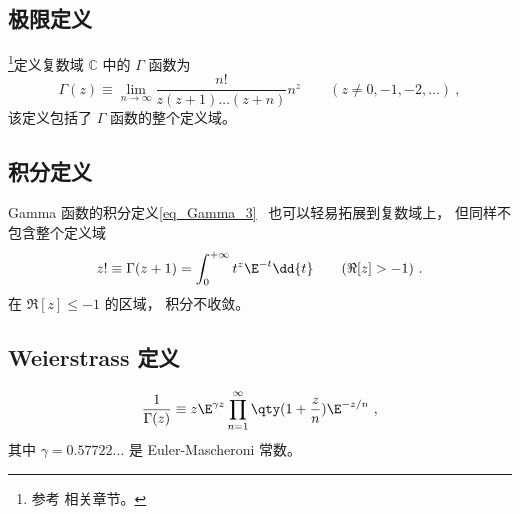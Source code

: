 

\subsection{极限定义}
\footnote{参考 \cite{Arfken} 相关章节。}定义复数域 $\mathbb C$ 中的 $\Gamma$ 函数为
\begin{equation}
\Gamma(z) \equiv \lim_{n\to\infty} \frac{n!}{z(z+1)\dots(z+n)}n^z \qquad (z \ne 0, -1, -2,\dots)~,
\end{equation}
该定义包括了 $\Gamma$ 函数的整个定义域。

\subsection{积分定义}
Gamma 函数的积分定义\autoref{eq_Gamma_3}~ 也可以轻易拓展到复数域上， 但同样不包含整个定义域
\begin{equation}
z! \equiv \Gamma (z + 1) = \int_0^{+\infty} t^z \E^{-t} \dd{t} \qquad (\Re[z] > -1)~.
\end{equation}
在 $\Re[z] \leqslant -1$ 的区域， 积分不收敛。

\subsection{Weierstrass 定义}
\begin{equation}
\frac{1}{\Gamma(z)} \equiv z \E^{\gamma z} \prod_{n=1}^\infty \qty(1 + \frac{z}{n}) \E^{-z/n}~,
\end{equation}
其中 $\gamma = 0.57722\dots$ 是 Euler-Mascheroni 常数。
